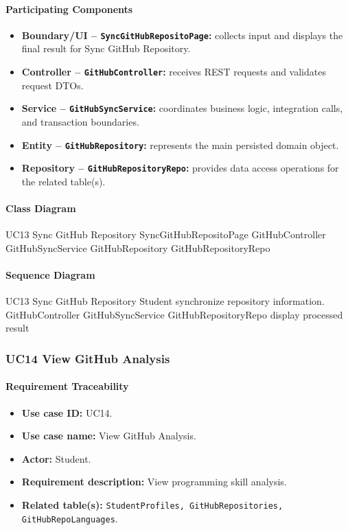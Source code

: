 \paragraph{Participating Components}

\begin{itemize}
    \item \textbf{Boundary/UI -- \texttt{SyncGitHubRepositoPage}:} collects input and displays the final result for Sync GitHub Repository.
    \item \textbf{Controller -- \texttt{GitHubController}:} receives REST requests and validates request DTOs.
    \item \textbf{Service -- \texttt{GitHubSyncService}:} coordinates business logic, integration calls, and transaction boundaries.
    \item \textbf{Entity -- \texttt{GitHubRepository}:} represents the main persisted domain object.
    \item \textbf{Repository -- \texttt{GitHubRepositoryRepo}:} provides data access operations for the related table(s).
\end{itemize}

\paragraph{Class Diagram}

\ClassDiagram
{UC13 Sync GitHub Repository}
{SyncGitHubRepositoPage}
{GitHubController}
{GitHubSyncService}
{GitHubRepository}
{GitHubRepositoryRepo}

\paragraph{Sequence Diagram}

\SequenceDiagram
{UC13 Sync GitHub Repository}
{Student}
{synchronize repository information.}
{GitHubController}
{GitHubSyncService}
{GitHubRepositoryRepo}
{display processed result}

\subsubsection{UC14 View GitHub Analysis}

\paragraph{Requirement Traceability}

\begin{itemize}
    \item \textbf{Use case ID:} UC14.
    \item \textbf{Use case name:} View GitHub Analysis.
    \item \textbf{Actor:} Student.
    \item \textbf{Requirement description:} View programming skill analysis.
    \item \textbf{Related table(s):} \texttt{StudentProfiles, GitHubRepositories, GitHubRepoLanguages}.
\end{itemize}

